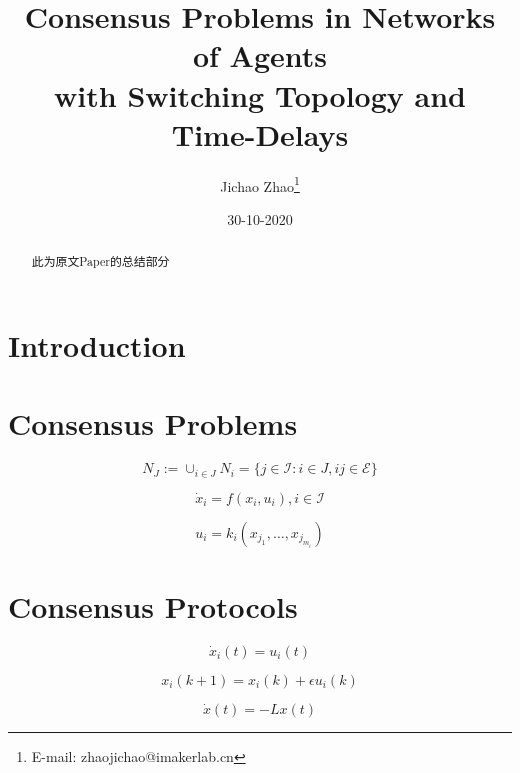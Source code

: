 \documentclass{article}
\title{Consensus Problems in Networks of Agents\\ with Switching Topology and Time-Delays}
\author{ Jichao Zhao\thanks{E-mail: zhaojichao@imakerlab.cn}}
\date{30-10-2020}
\begin{document}
\maketitle

\begin{abstract}
    此为原文Paper的总结部分
\end{abstract}



\clearpage
\section{Introduction}

\section{Consensus Problems}

\begin{equation}
    N_J:=\cup_{i\in J}N_i=\{j\in \mathcal{I}:i\in J, ij\in \mathcal{E}\}
    \tag{1}
    \label{1}
\end{equation}

\begin{equation}
    \dot{x}_i = f(x_i, u_i), i\in \mathcal{I}
    \tag{2}
    \label{2}
\end{equation}

\begin{equation}
    u_i = k_i(x_{j_1},\dots,x_{j_{m_i}})
    \tag{3}
    \label{3}
\end{equation}

\section{Consensus Protocols}

\begin{equation}
    \dot{x}_i(t) = u_i(t)
    \tag{4}
    \label{4}
\end{equation}

\begin{equation}
    x_i(k+1) = x_i(k)+\epsilon u_i(k)
    \tag{5}
    \label{5}
\end{equation}

\begin{equation}
    \dot{x}(t) = -Lx(t) 
    \tag{6}
    \label{6}
\end{equation}
\end{document}
